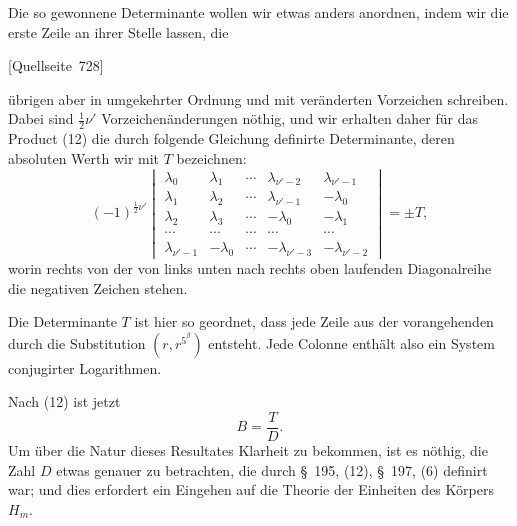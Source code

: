 \documentclass[11pt]{article}
\newcommand{\srcpage}[1]{\par\medskip\noindent\textsf{[Quellseite~#1]}\par\smallskip}
\begin{document}
Die so gewonnene Determinante wollen wir etwas anders anordnen, indem wir die erste Zeile an ihrer Stelle lassen, die
\srcpage{728}
übrigen aber in umgekehrter Ordnung und mit veränderten Vorzeichen schreiben. Dabei sind $\frac12\nu'$ Vorzeichenänderungen nöthig, und wir erhalten daher für das Product (12) die durch folgende Gleichung definirte Determinante, deren absoluten Werth wir mit $T$ bezeichnen:
\begin{equation}
(-1)^{\frac12\nu'}
\begin{vmatrix}
\lambda_0&\lambda_1&\cdots&\lambda_{\nu'-2}&\lambda_{\nu'-1}\\
\lambda_1&\lambda_2&\cdots&\lambda_{\nu'-1}&-\lambda_0\\
\lambda_2&\lambda_3&\cdots&-\lambda_0&-\lambda_1\\
\cdots&\cdots&\cdots&\cdots&\cdots\\
\lambda_{\nu'-1}&-\lambda_0&\cdots&-\lambda_{\nu'-3}&-\lambda_{\nu'-2}
\end{vmatrix}=\pm T,
\tag{14}
\end{equation}
worin rechts von der von links unten nach rechts oben laufenden Diagonalreihe die negativen Zeichen stehen.

Die Determinante $T$ ist hier so geordnet, dass jede Zeile aus der vorangehenden durch die Substitution $(r,r^{5^\beta})$ entsteht. Jede Colonne enthält also ein System conjugirter Logarithmen.

Nach (12) ist jetzt
\begin{equation}
B=\frac{T}{D}.
\tag{15}
\end{equation}
Um über die Natur dieses Resultates Klarheit zu bekommen, ist es nöthig, die Zahl $D$ etwas genauer zu betrachten, die durch \S~195, (12), \S~197, (6) definirt war; und dies erfordert ein Eingehen auf die Theorie der Einheiten des Körpers $H_m$.
\end{document}
